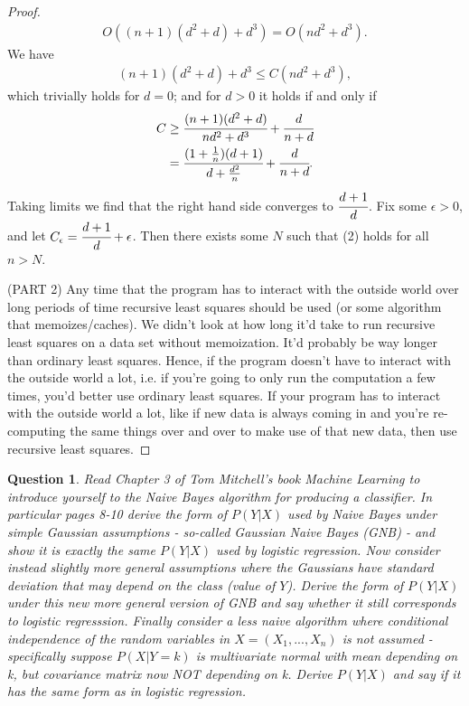 \documentclass[12pt]{article}
\newtheorem{question}{Question}
\begin{document}
\begin{proof}
\begin{align*}
   O((n+1)(d^2 + d) + d^3) = O(nd^2 + d^3).
\end{align*}
We have
\begin{align}
  (n+1)(d^2 + d) + d^3 \leq C(nd^2 + d^3),
\end{align}
which trivially holds for $d=0$; and for $d > 0$ it holds if and only if 
\begin{align*}
  C &\geq \cfrac{(n+1)(d^2+d)}{nd^2+d^3} + \cfrac{d}{n+d} \\
  &= \cfrac{(1+\frac{1}{n})(d+1)}{d+\frac{d^2}{n}} + \cfrac{d}{n+d}.
\end{align*}
Taking limits we find that the right hand side converges to $\cfrac{d+1}{d}$. Fix some $\epsilon>0$, and let $C_{\epsilon} = \cfrac{d+1}{d} + \epsilon$. Then there exists some $N$ such that (2) holds for all $n>N$. \bigbreak

(PART 2) Any time that the program has to interact with the outside world over long periods of time recursive least squares should be used (or some algorithm that memoizes/caches). We didn't look at how long it'd take to run recursive least squares on a data set without memoization. It'd probably be way longer than ordinary least squares. Hence, if the program doesn't have to interact with the outside world a lot, i.e. if you're going to only run the computation a few times, you'd better use ordinary least squares. If your program has to interact with the outside world a lot, like if new data is always coming in and you're re-computing the same things over and over to make use of that new data, then use recursive least squares.

\end{proof}
\begin{question}
  Read Chapter 3 of Tom Mitchell's book Machine Learning to introduce yourself to the Naive Bayes algorithm for producing a classifier. In particular pages 8-10 derive the form of $P(Y|X)$ used by Naive Bayes under simple Gaussian assumptions - so-called Gaussian Naive Bayes (GNB) - and show it is exactly the same $P(Y|X)$ used by logistic regression. Now consider instead slightly more general assumptions where the Gaussians have standard deviation that may depend on the class (value of $Y$). Derive the form of $P(Y|X)$ under this new more general version of GNB and say whether it still corresponds to logistic regresssion. Finally consider a less naive algorithm where conditional independence of the random variables in $X = (X_1, ..., X_n)$ is not assumed - specifically suppose $P(X|Y=k)$ is multivariate normal with mean depending on k, but covariance matrix now NOT depending on k. Derive $P(Y|X)$ and say if it has the same form as in logistic regression.
\end{question}
\end{document}

